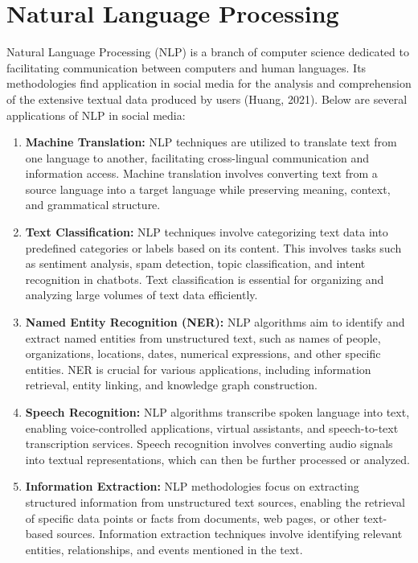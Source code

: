 \section{Natural Language Processing}
Natural Language Processing (NLP) is a branch of computer science dedicated to facilitating communication between computers and human languages. Its methodologies find application in social media for the analysis and comprehension of the extensive textual data produced by users (Huang, 2021). Below are several applications of NLP in social media:
\begin{enumerate}
	\item \textbf{Machine Translation:} NLP techniques are utilized to translate text from one language to another, facilitating cross-lingual communication and information access. Machine translation involves converting text from a source language into a target language while preserving meaning, context, and grammatical structure.

	\item \textbf{Text Classification:} NLP techniques involve categorizing text data into predefined categories or labels based on its content. This involves tasks such as sentiment analysis, spam detection, topic classification, and intent recognition in chatbots. Text classification is essential for organizing and analyzing large volumes of text data efficiently.
	
	\item \textbf{Named Entity Recognition (NER):} NLP algorithms aim to identify and extract named entities from unstructured text, such as names of people, organizations, locations, dates, numerical expressions, and other specific entities. NER is crucial for various applications, including information retrieval, entity linking, and knowledge graph construction.
	
	\item \textbf{Speech Recognition:} NLP algorithms transcribe spoken language into text, enabling voice-controlled applications, virtual assistants, and speech-to-text transcription services. Speech recognition involves converting audio signals into textual representations, which can then be further processed or analyzed.
	
	\item \textbf{Information Extraction:} NLP methodologies focus on extracting structured information from unstructured text sources, enabling the retrieval of specific data points or facts from documents, web pages, or other text-based sources. Information extraction techniques involve identifying relevant entities, relationships, and events mentioned in the text.
	

\end{enumerate}
